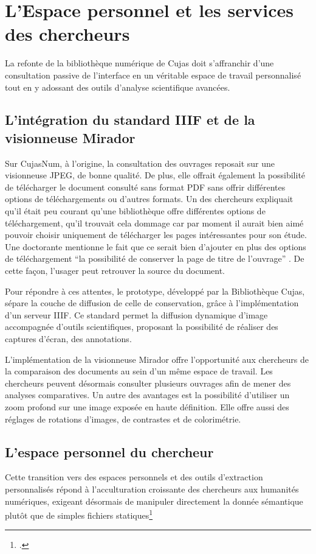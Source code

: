 \section{L'Espace personnel et les services des chercheurs}
La refonte de la bibliothèque numérique de Cujas doit s'affranchir d'une consultation passive de l'interface en un véritable espace de travail personnalisé tout en y adossant des outils d'analyse scientifique avancées.

\subsection{L'intégration du standard IIIF et de la visionneuse Mirador}
Sur CujasNum, à l'origine, la consultation des ouvrages reposait sur une visionneuse \ac{JPEG}, de bonne qualité. De plus, elle offrait également la possibilité de télécharger le document consulté sans format \ac{PDF} sans offrir différentes options de téléchargements ou d'autres formats. Un des chercheurs expliquait qu'il était peu courant qu'une bibliothèque offre différentes options de téléchargement, qu'il trouvait cela dommage car par moment il aurait bien aimé pouvoir choisir uniquement de télécharger les pages intéressantes pour son étude. Une doctorante mentionne le fait que ce serait bien d'ajouter en plus des options de téléchargement \enquote{la possibilité de conserver la page de titre de l'ouvrage} . De cette façon, l'usager peut retrouver la source du document.

Pour répondre à ces attentes, le prototype, développé par la Bibliothèque Cujas, sépare la couche de diffusion de celle de conservation, grâce à l'implémentation d'un serveur \ac{IIIF}. Ce standard permet la diffusion dynamique d'image accompagnée d'outils scientifiques, proposant la possibilité de réaliser des captures d'écran, des annotations.

L'implémentation de la visionneuse Mirador offre l'opportunité aux chercheurs de la comparaison des documents au sein d'un même espace de travail. Les chercheurs peuvent désormais consulter plusieurs ouvrages afin de mener des analyses comparatives. Un autre des avantages est la possibilité d'utiliser un zoom profond sur une image exposée en haute définition. Elle offre aussi des réglages de rotations d'images, de contrastes et de colorimétrie.

\subsection{L'espace personnel du chercheur}
Cette transition vers des espaces personnels et des outils d'extraction personnalisés répond à l'acculturation croissante des chercheurs aux humanités numériques, exigeant désormais de manipuler directement la donnée sémantique plutôt que de simples fichiers statiques\footcite{mesguichBibliothequesFaceMonde}

